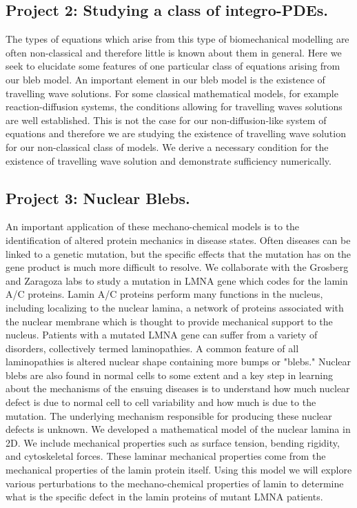 \subsection*{Project 2: Studying a class of integro-PDEs.}
The types of equations which arise from this type of biomechanical modelling are often non-classical and therefore little is known about them in general. Here we seek to elucidate some features of one particular class of equations arising from our bleb model. An important element in our bleb model is the existence of travelling wave solutions. For some classical mathematical models, for example reaction-diffusion systems, the conditions allowing for travelling waves solutions are well established. This is not the case for our  non-diffusion-like system of equations and therefore we are studying the existence of travelling wave solution for our non-classical class of models. We derive a necessary condition for the existence of travelling wave solution and demonstrate sufficiency numerically. 

\subsection*{Project 3: Nuclear Blebs.}
An important application of these mechano-chemical models is to the identification of altered protein mechanics in disease states. Often diseases can be linked to a genetic mutation, but the specific effects that the mutation has on the gene product is much more difficult to resolve. We collaborate with the Grosberg and Zaragoza labs to study a mutation in LMNA gene which codes for the lamin A/C proteins. Lamin A/C proteins perform many functions in the nucleus, including localizing to the nuclear lamina, a network of proteins associated with the nuclear membrane which is thought to provide mechanical support to the nucleus. Patients with a mutated LMNA gene can suffer from a variety of disorders, collectively termed laminopathies. A common feature of all laminopathies is altered nuclear shape containing more bumps or "blebs." Nuclear blebs are also found in normal cells to some extent and a key step in learning about the mechanisms of the ensuing diseases is to understand how much nuclear defect is due to normal cell to cell variability and how much is due to the mutation. The underlying mechanism responsible for producing these nuclear defects is unknown. We developed a mathematical model of the nuclear lamina in 2D. We include mechanical properties such as surface tension, bending rigidity, and cytoskeletal forces. These laminar mechanical properties come from the mechanical properties of the lamin protein itself. Using this model we will explore various perturbations to the mechano-chemical properties of lamin to determine what is the specific defect in the lamin proteins of mutant LMNA patients.